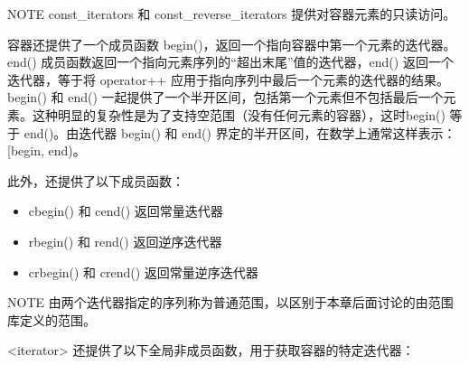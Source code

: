 \begin{myNotic}{NOTE}
const\_iterators 和 const\_reverse\_iterators 提供对容器元素的只读访问。
\end{myNotic}

容器还提供了一个成员函数 begin()，返回一个指向容器中第一个元素的迭代器。end() 成员函数返回一个指向元素序列的“超出末尾”值的迭代器，end() 返回一个迭代器，等于将 operator++ 应用于指向序列中最后一个元素的迭代器的结果。begin() 和 end() 一起提供了一个半开区间，包括第一个元素但不包括最后一个元素。这种明显的复杂性是为了支持空范围（没有任何元素的容器），这时begin() 等于 end()。由迭代器 begin() 和 end() 界定的半开区间，在数学上通常这样表示：[begin, end)。

此外，还提供了以下成员函数：

\begin{itemize}
\item
cbegin() 和 cend() 返回常量迭代器

\item
rbegin() 和 rend() 返回逆序迭代器

\item
crbegin() 和 crend() 返回常量逆序迭代器
\end{itemize}

\begin{myNotic}{NOTE}
由两个迭代器指定的序列称为普通范围，以区别于本章后面讨论的由范围库定义的范围。
\end{myNotic}

<iterator> 还提供了以下全局非成员函数，用于获取容器的特定迭代器：

